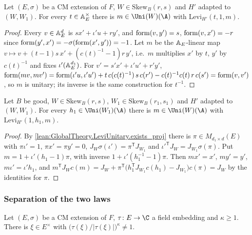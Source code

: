 \begin{lemma}\label{pf:thmK-cone:leviW}
Let $(E,\sigma)$ be a CM extension of $F$, $W\in\mathrm{Skew}_B(r,s)$ and $H'$ adapted to $(W,W_1)$.  For every
$t\in\mathbb{A}_E^\times$ there is $m\in\Uni(W)(\A)$ with $\mathrm{Levi}_{H'}(t,1,m)$.
\end{lemma}

\begin{proof}
Every $v\in\mathbb{A}_E^d$ is $sx'+\iota'u+ry'$, and $\operatorname{form}(v,y')=s$, $\operatorname{form}(v,x')=-r$ since
$\operatorname{form}(y',x')=-\sigma(\operatorname{form}(x',y'))=-1$.  Let $m$ be the $\mathbb{A}_E$-linear map
$v\mapsto v+(t-1)s\,x'+(c(t)^{-1}-1)r\,y'$, i.e.\ $m$ multiplies $x'$ by $t$, $y'$ by $c(t)^{-1}$ and fixes
$\iota'(\mathbb{A}_E^{d_1})$.  For $v'=s'x'+\iota'u'+r'y'$,
$\operatorname{form}(mv,mv')=\operatorname{form}(\iota'u,\iota'u')+t\,c(c(t)^{-1})\,s\,c(r')-c(t)^{-1}c(t)\,r\,c(s')=
\operatorname{form}(v,v')$, so $m$ is unitary; its inverse is the same construction for $t^{-1}$.
\end{proof}

\begin{lemma}\label{pf:thmK-cone:leviW1}
Let $B$ be good, $W\in\mathrm{Skew}_B(r,s)$, $W_1\in\mathrm{Skew}_B(r_1,s_1)$ and $H'$ adapted to $(W,W_1)$.  For every
$h_1\in\Uni(W_1)(\A)$ there is $m\in\Uni(W)(\A)$ with $\mathrm{Levi}_{H'}(1,h_1,m)$.
\end{lemma}

\begin{proof}
By \cref{lean:GlobalTheory.LeviUnitary.exists_proj} there is $\pi\in M_{d_1\times d}(E)$ with $\pi\iota'=1$,
$\pi x'=\pi y'=0$, $J_W\sigma(\iota')=\pi^{\mathsf T}J_{W_1}$ and $\iota'^{\mathsf T}J_W=J_{W_1}\sigma(\pi)$.  Put
$m=1+\iota'(h_1-1)\pi$, with inverse $1+\iota'(h_1^{-1}-1)\pi$.  Then $mx'=x'$, $my'=y'$, $m\iota'=\iota'h_1$, and
$m^{\mathsf T}J_Wc(m)=J_W+\pi^{\mathsf T}\bigl(h_1^{\mathsf T}J_{W_1}c(h_1)-J_{W_1}\bigr)c(\pi)=J_W$ by the identities
for $\pi$.
\end{proof}

\subsubsection{Separation of the two laws}

\begin{lemma}\label{pf:thmK-cone:angle}
Let $(E,\sigma)$ be a CM extension of $F$, $\tau\colon E\to\C$ a field embedding and $\kappa\ge1$.  There is
$\xi\in E^\times$ with $\bigl(\tau(\xi)/|\tau(\xi)|\bigr)^\kappa\neq1$.
\end{lemma}

